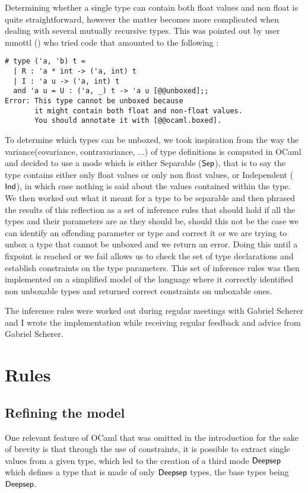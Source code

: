 \documentclass[a4]{article}
\begin{document}
Determining whether a single type can contain both float values and non float is quite straightforward, however the matter becomes more complicated when dealing with several mutually recursive types. This was pointed out by user mmottl () who tried code that amounted to the following :

\begin{lstlisting}
# type ('a, 'b) t =
  | R : 'a * int -> ('a, int) t
  | I : 'a u -> ('a, int) t
  and 'a u = U : ('a, _) t -> 'a u [@@unboxed];;
Error: This type cannot be unboxed because
       it might contain both float and non-float values.
       You should annotate it with [@@ocaml.boxed].
\end{lstlisting}

To determine which types can be unboxed, we took inspiration from the way the variance(covariance, contravariance, ...) of type definitions is computed in OCaml and decided to use a mode which is either Separable ($\mathsf{Sep}$), that is to say the type contains either only float values or only non float values, or {Independent} ($\mathsf{Ind}$), in which case nothing is said about the values contained within the type. We then worked out what it meant for a type to be separable and then phrased the results of this reflection as a set of inference rules that should hold if all the types and their parameters are as they should be, should this not be the case we can identify an offending parameter or type and correct it or we are trying to unbox a type that cannot be unboxed and we return an error. Doing this until a fixpoint is reached or we fail allows us to check the set of type declarations and establish constraints on the type parameters. This set of inference rules was then implemented on a simplified model of the language where it correctly identified non unboxable types and returned correct constraints on unboxable ones.

The inference rules were worked out during regular meetings with Gabriel Scherer and I wrote the implementation while receiving regular feedback and advice from Gabriel Scherer.

\section{Rules}

\subsection{Refining the model}
One relevant feature of OCaml that was omitted in the introduction for the sake of brevity is that through the use of constraints, it is possible to extract single values from a given type, which led to the creation of a third mode $\mathsf{Deepsep}$ which defines a type that is made of only $\mathsf{Deepsep}$ types, the base types being $\mathsf{Deepsep}$.
\end{document}
